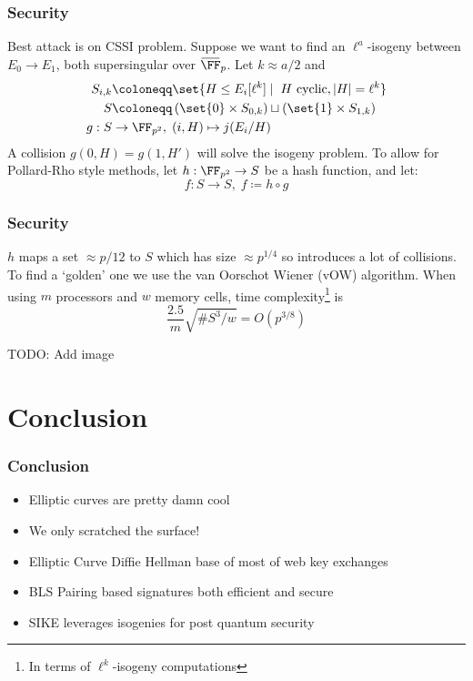 \documentclass{beamer}
\newcommand{\overbar}[1]{\mkern 1.5mu\overline{\mkern-1.5mu#1\mkern-1.5mu}\mkern 1.5mu}
\begin{document}
\begin{frame}
    \frametitle{Security}
    Best attack is on CSSI problem. Suppose we want to find an $\ell^a$-isogeny  between $E_0 \to E_1$, both 
    supersingular over $\overbar{\FF}_p$. Let $k \approx a/2$ and
    \begin{align*}
        S_{i, k} &\coloneqq \set{ H \leq E_i[\ell^k] \mid \; H \text{ cyclic}, |H| = \ell^k } \\
        S &\coloneqq \left( \set{0} \times S_{0, k} \right) \sqcup \left( \set{1} \times S_{1, k} \right) \\
        g: S &\to \FF_{p^2}, \; (i, H) \mapsto j(E_{i}/H)
    \end{align*}
    A collision $g(0, H) = g(1, H')$ will solve the isogeny problem. To allow for Pollard-Rho style methods, let $h: \FF_{p^2} \to S$ 
    be a hash function, and let:
    \[ f: S \to S,\; f \coloneqq h \circ g \]
\end{frame}

\begin{frame}
    \frametitle{Security}
    $h$ maps a set $\approx p/12$ to $S$ which has size $\approx p^{1/4}$ so introduces a lot of collisions.
    To find a `golden' one we use the van Oorschot Wiener (vOW) algorithm. 
    When using $m$ processors and $w$ memory cells, time complexity\footnote{In terms of $\ell^k$-isogeny computations} is 
    \[ \frac{2.5}{m}\sqrt{\#S^3/w} = O(p^{3/8})  \]
    
    TODO: Add image
\end{frame}

\section{Conclusion}
\begin{frame}
    \frametitle{Conclusion}
    \begin{itemize}
        \item Elliptic curves are pretty damn cool
        \item We only scratched the surface!
        \item Elliptic Curve Diffie Hellman base of most of web key exchanges
        \item BLS Pairing based signatures both efficient and secure
        \item SIKE leverages isogenies for post quantum security
    \end{itemize}
    

\end{frame}
\end{document}

